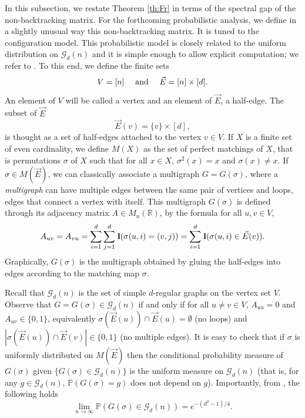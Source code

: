 \documentclass[11pt]{article}
\newcommand{\dP}{\mathbb{P}}
\newcommand{\dR}{\mathbb {R}}
\newcommand{\cG}{\mathcal {G}}
\newcommand{\PAR}[1]{{{\left(#1\right)}}} %
\newcommand{\1}{1\!\!{\sf I}}\newcommand{\IND}{\1}
\newcommand{\si}{\sigma}
\begin{document}
In this subsection, we restate Theorem \ref{th:Fr} in terms of the spectral gap of the non-backtracking matrix. For the forthcoming probabilistic analysis, we define in a slightly unusual way this non-backtracking matrix. It is tuned to the configuration model. This probabilistic model is closely related to the uniform distribution on $\cG_d(n)$ and it is simple enough to allow  explicit computation; we refer to \cite{MR1864966}.  To this end, we define the finite sets
$$
V= [n] \quad \hbox{ and }  \quad \vec E = [n] \times [d].
$$
An element of $V$ will be called a vertex and an element of $\vec E$, a half-edge. The subset of $\vec E$
\begin{equation}\label{eq:defEv}
\vec E(v) = \{v \} \times [d], 
\end{equation}
is thought as a set of half-edges attached to the vertex $v \in V$.
If  $X$ is a finite set of even cardinality, we define $M(X)$ as the set of perfect matchings of $X$, that is permutations $\si$ of $X$ such that  for all $x \in X$, $\si^2 (x)= x$ and $\si(x) \ne x$. If $\sigma \in M(\vec E)$, we can classically associate a multigraph $G = G (\sigma) $, where a {\em multigraph} can have multiple edges between the same pair of vertices and loops, edges that connect a vertex with itself. This multigraph $G(\sigma)$ is defined through its adjacency matrix $A \in M_n (\dR)$, by the formula for all $u, v \in V$,
$$
A_{uv} = A_{vu}  = \sum_{i = 1} ^d \sum_{j = 1} ^d \IND ( \si(u,i) =( v,j) ) = \sum_{i = 1} ^d \IND ( \si(u,i) \in \vec E(v)).
$$
Graphically, $G(\sigma)$ is the multigraph obtained by gluing the half-edges into edges according to the matching map $\sigma$. 


Recall that $\cG_d(n)$ is the set of simple $d$-regular graphs on the vertex set $V$. Observe that $G  = G(\sigma)  \in \cG_d (n)$ if and only if for all $u \ne v \in V$, $A_{uu} = 0$ and $A_{uv} \in \{ 0,1\}$, equivalently   $\si(\vec E(u) ) \cap \vec E(u)= \emptyset$ (no loops) and $|\si(\vec E(u) ) \cap \vec E(v) | \in \{0,1\}$ (no multiple edges). It is easy to check that if $\sigma$ is uniformly distributed on $M(\vec E)$ then the conditional probability measure of $G(\sigma)$ given $\{ G(\sigma) \in \cG_d (n)\}$  is the uniform measure on $\cG_d(n)$ (that is, for any $g \in \cG_d (n)$, $
\dP \PAR{ G(\sigma ) = g }$ does not depend on $g$). Importantly, from \cite[Theorem 2.16]{MR1864966}, the following holds 
\begin{equation}\label{eq:Poiloop}
\lim_{n \to \infty} \dP ( G(\sigma ) \in \cG_d (n) ) =  e^{-(d^2-1)/4}.
\end{equation}
\end{document}
